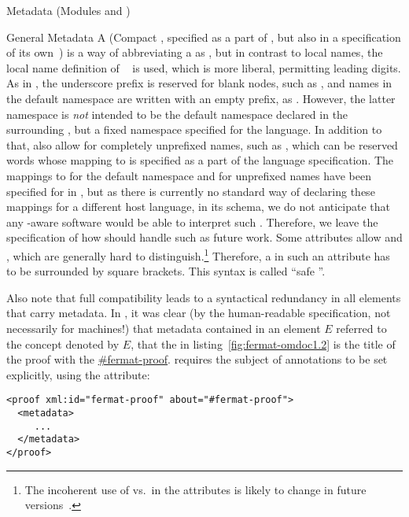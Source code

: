 \begin{tchapter}[id=metadata,short=Metadata]{Metadata (Modules {} and  {})}
\begin{tsection}{General Metadata}
A \curie (Compact \uri, specified as a part of \rdfa, but also in a
specification of its own~\cite{W3C09:CURIE}) is a way of abbreviating
a \uri as , but in contrast to \xml
local names, the local name definition of
\sparql~\cite{PruSea08:sparql} is used, which is more liberal, \eg
permitting leading digits.  As in \sparql, the underscore prefix is
reserved for blank nodes, such as , and names
in the default namespace are written with an empty prefix, \ie as
.  However, the latter namespace is \emph{not}
intended to be the default namespace declared in the surrounding \xml,
but a fixed namespace specified for the language.  In addition to
that, \curies also allow for completely unprefixed names, such as
, which can be reserved words whose mapping to
\uris is specified as a part of the language specification.  The
mappings to \uris for the default namespace and for unprefixed names
have been specified for \rdfa in \xhtml, but as there is currently no
standard way of declaring these mappings for a different host
language, \eg in its \xml schema, we do not anticipate that any
\rdfa-aware software would be able to interpret such \curies.  Therefore, we leave the specification of how \omdoc should handle such \curies as future work.  Some \rdfa attributes allow \uris and \curies, which are generally hard to distinguish.\footnote{The incoherent use of \uris vs.\ \curies in the \rdfa attributes is likely to change in future versions~\cite{Birbeck:ProposalForURIsEverywhere2009}.}  Therefore, a \curie in such an attribute has to be surrounded by square brackets.  This syntax is called \enquote{safe \curie}.

Also note that full \rdfa compatibility leads to a syntactical redundancy in all \omdoc elements that carry metadata.  In , it was clear (by the human-readable specification, not necessarily for machines!) that metadata contained in an \xml element $E$ referred to the concept denoted by $E$, \eg[,] that the  in listing~\ref{fig:fermat-omdoc1.2} is the title of the proof with the \uri \url{#fermat-proof}.  \rdfa requires the subject of annotations to be set explicitly, using the  attribute:

\begin{lstlisting}[language={[1.2]OMDoc}]
<proof xml:id="fermat-proof" about="#fermat-proof">
  <metadata>
     ...
  </metadata>
</proof>
\end{lstlisting}


\end{tsection}
\end{tchapter}
